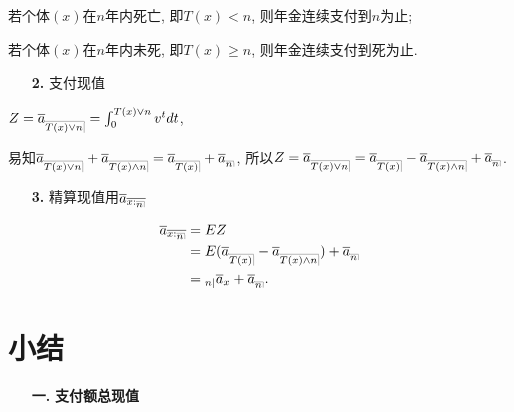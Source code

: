\documentclass[a4paper,10pt]{ctexbook}
\makeatletter
\newcommand{\hei}{\CJKfamily{hei}}      %
\DeclareRobustCommand{\annu}[1]{_{%
    \def\arraystretch{0}%
    \setlength\arraycolsep{1pt}%
    \setlength\arrayrulewidth{.2pt}%
    \begin{array}[b]{@{}c|}\hline
        \\[\arraycolsep]%
        \scriptstyle #1%
    \end{array}%
}}
\makeatother
\begin{document}
若个体$(x)$在$n$年内死亡, 即$T(x)<n$, 则年金连续支付到$n$为止;

若个体$(x)$在$n$年内未死, 即$T(x)\ge n$, 则年金连续支付到死为止.

\begin{itemize}
    \item[{\bf\hei 2.}] 支付现值
\end{itemize}

$Z=\overline {a}_{\annu{T(x)\lor n}}=\int_0^{{T(x)\lor n}}v^tdt$,

易知$\overline {a}_{\annu{T(x)\lor n}}+\overline {a}_{\annu{T(x)\land n}}=\overline {a}_{\annu{T(x)}}+\overline {a}_{\annu{n}}$, 所以$Z=\overline {a}_{\annu{T(x)\lor n}}=\overline {a}_{\annu{T(x)}}-\overline {a}_{\annu{T(x)\land n}}+\overline {a}_{\annu{n}}$.

\begin{itemize}
    \item[{\bf\hei 3.}] 精算现值用$\overline a_{\overline{x:\annu{n}}}$
\end{itemize}
$$
    \begin{aligned}
        \overline a_{\overline{x:\annu{n}}}
         & =EZ                                                                                        \\
         & =E(\overline a_{\annu {T(x) }}-\overline a_{\annu {T(x) \land n}})+\overline a_{\annu {n}} \\
         & ={}_{n|}\overline{a}_{x}+\overline a_{\annu {n}}
        .
    \end{aligned}
$$

\section{小结}
\begin{itemize}
    \item[{\bf\hei 一.}]{\bf\hei 支付额总现值}
\end{itemize}
\end{document}
